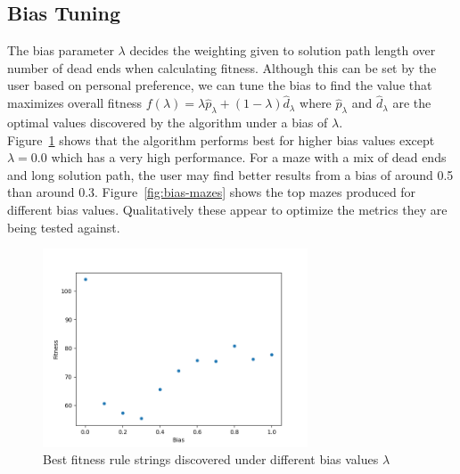 \subsection{Bias Tuning}
The bias parameter $\lambda$ decides the weighting given to solution path length over number of dead ends when calculating fitness. Although this can be set by the user based on personal preference, we can tune the bias to find the value that maximizes overall fitness  $f(\lambda) = \lambda \hat{p}_\lambda + (1-\lambda)\hat{d}_\lambda$ where $ \hat{p}_\lambda$ and $\hat{d}_\lambda$ are the optimal values discovered by the algorithm under a bias of $\lambda$.\\ 

Figure~\ref{fig:bias-tuning} shows that the algorithm performs best for higher bias values except $\lambda=0.0$ which has a very high performance. For a maze with a mix of dead ends and long solution path, the user may find better results from a bias of around 0.5 than around 0.3. Figure~\ref{fig:bias-mazes} shows the top mazes produced for different bias values. Qualitatively these appear to optimize the metrics they are being tested against.\\

\begin{figure}[!h]
\centering
\includegraphics[width=0.7\textwidth]{images/bias-tuning.png}
\caption{Best fitness rule strings discovered under different bias values $\lambda$}
\label{fig:bias-tuning}
\end{figure}

